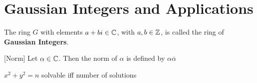 \documentclass{memoir}
\begin{document}
\section{Gaussian Integers and Applications}
\label{sec:gaussian_integers_and_applications}

\begin{defn}
	The ring \(G\) with elements \(a+bi \in \mathbb{C}\), with \(a,b \in \mathbb{Z}\), is called the ring of \textbf{Gaussian Integers}.
\end{defn}[Norm]
Let \(\alpha \in \mathbb{C}\). Then the norm of \(\alpha\) is defined by \(\alpha \overline{\alpha}\)
\begin{thm}
	\(x^2+y^2 = n\) solvable iff number of solutions
\end{thm}
\end{document}
